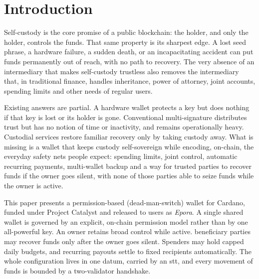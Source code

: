 \documentclass[11pt,DIV=11,parskip=half-]{scrartcl}
\begin{document}
{}%
\printunsrtglossaries
\newpage

\section{Introduction}
\label{sec:intro}

Self-custody is the core promise of a public blockchain: the holder, and only the holder, controls the funds. That same property is its sharpest edge. A lost seed phrase, a hardware failure, a sudden death, or an incapacitating accident can put funds permanently out of reach, with no path to recovery. The very absence of an intermediary that makes self-custody trustless also removes the intermediary that, in traditional finance, handles inheritance, power of attorney, joint accounts, spending limits and other needs of regular users.

Existing answers are partial. A hardware wallet protects a key but does nothing if that key is lost or its holder is gone. Conventional multi-signature distributes trust but has no notion of time or inactivity, and remains operationally heavy. Custodial services restore familiar recovery only by taking custody away. What is missing is a wallet that keeps custody self-sovereign while encoding, on-chain, the everyday safety nets people expect: spending limits, joint control, automatic recurring payments, multi-wallet backup and a way for trusted parties to recover funds if the owner goes silent, with none of those parties able to seize funds while the owner is active.

This paper presents a permission-based (dead-man-switch) wallet for Cardano, funded under Project Catalyst \cite{projectCatalyst, catalystMilestones} and released to users as \emph{Epora}. A single shared wallet is governed by an explicit, on-chain permission model rather than by one all-powerful key. An \gls{owner} retains broad control while active. \Gls{beneficiary} parties may recover funds only after the owner goes silent. Spenders may hold capped daily budgets, and recurring payouts settle to fixed recipients automatically. The whole configuration lives in one datum, carried by an \gls{stt}, and every movement of funds is bounded by a two-validator handshake.
\end{document}
